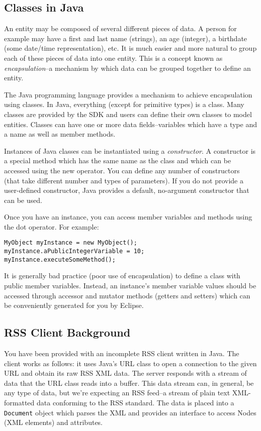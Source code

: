 \documentclass[12pt]{scrartcl}
\begin{document}
\subsection*{Classes in Java}

An entity may be composed of several different pieces of data.  
A person for example may have a first and last name (strings), 
an age (integer), a birthdate (some date/time representation), 
etc.  It is much easier and more natural to group each of these 
pieces of data into one entity.  This is a concept known as 
\emph{encapsulation}--a mechanism by which data can be grouped 
together to define an entity.

The Java programming language provides a mechanism to 
achieve encapsulation using classes.  In Java, everything 
(except for primitive types) is a class.  Many classes are 
provided by the SDK and users can define their own classes 
to model entities.  Classes can have one or more data 
fields--variables which have a type and a name as well 
as member methods.  

Instances of Java classes can be instantiated using a 
\emph{constructor}.  A constructor is a special method which 
has the same name as the class and which can be accessed 
using the new operator.  You can define any number of 
constructors (that take different number and types of 
parameters).  If you do not provide a user-defined constructor, 
Java provides a default, no-argument constructor that can be 
used.

Once you have an instance, you can access member variables 
and methods using the dot operator.  For example:

\begin{verbatim}
MyObject myInstance = new MyObject();
myInstance.aPublicIntegerVariable = 10;
myInstance.executeSomeMethod();
\end{verbatim}

It is generally bad practice (poor use of encapsulation) to define 
a class with public member variables.  Instead, an instance's 
member variable values should be accessed through accessor 
and mutator methods (getters and setters) which can be
conveniently generated for you by Eclipse.

\subsection*{RSS Client Background}

You have been provided with an incomplete RSS client written 
in Java.  The client works as follows: it uses Java's URL class to 
open a connection to the given URL and obtain its raw RSS XML 
data.  The server responds with a stream of data that the URL 
class reads into a buffer.  This data stream can, in general, be 
any type of data, but we're expecting an RSS feed--a stream of 
plain text XML-formatted data conforming to the RSS standard.  
The data is placed into a \texttt{Document} object which parses the XML 
and provides an interface to access Nodes (XML elements) and attributes.
\end{document}
